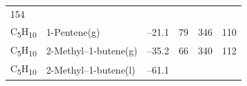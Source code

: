 \documentclass[
  9pt,
]{extbook}
\theoremstyle{definition}
\theoremstyle{definition}
\theoremstyle{definition}
\theoremstyle{remark}
\begin{document}
\begin{longtable}[]{@{}llllll@{}}
\begin{minipage}[t]{0.14\columnwidth}
154\strut
\end{minipage}\tabularnewline
\begin{minipage}[t]{0.07\columnwidth}\raggedright
C\textsubscript{5}H\textsubscript{10}\strut
\end{minipage} & \begin{minipage}[t]{0.17\columnwidth}\raggedright
1-Pentene(g)\strut
\end{minipage} & \begin{minipage}[t]{0.15\columnwidth}\raggedright
--21.1\strut
\end{minipage} & \begin{minipage}[t]{0.15\columnwidth}\raggedright
79\strut
\end{minipage} & \begin{minipage}[t]{0.14\columnwidth}\raggedright
346\strut
\end{minipage} & \begin{minipage}[t]{0.14\columnwidth}\raggedright
110\strut
\end{minipage}\tabularnewline
\begin{minipage}[t]{0.07\columnwidth}\raggedright
C\textsubscript{5}H\textsubscript{10}\strut
\end{minipage} & \begin{minipage}[t]{0.17\columnwidth}\raggedright
2-Methyl--1-butene(g)\strut
\end{minipage} & \begin{minipage}[t]{0.15\columnwidth}\raggedright
--35.2\strut
\end{minipage} & \begin{minipage}[t]{0.15\columnwidth}\raggedright
66\strut
\end{minipage} & \begin{minipage}[t]{0.14\columnwidth}\raggedright
340\strut
\end{minipage} & \begin{minipage}[t]{0.14\columnwidth}\raggedright
112\strut
\end{minipage}\tabularnewline
\begin{minipage}[t]{0.07\columnwidth}\raggedright
C\textsubscript{5}H\textsubscript{10}\strut
\end{minipage} & \begin{minipage}[t]{0.17\columnwidth}\raggedright
2-Methyl--1-butene(l)\strut
\end{minipage} & \begin{minipage}[t]{0.15\columnwidth}\raggedright
--61.1\strut
\end{minipage} & \begin{minipage}[t]{0.15\columnwidth}\raggedright

\end{minipage}
\end{longtable}
\end{document}
